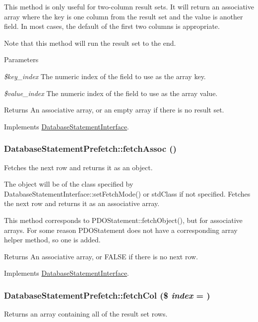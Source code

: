 This method is only useful for two-\/column result sets. It will return an associative array where the key is one column from the result set and the value is another field. In most cases, the default of the first two columns is appropriate.

Note that this method will run the result set to the end.


\begin{DoxyParams}{Parameters}
\item[{\em \$key\_\-index}]The numeric index of the field to use as the array key. \item[{\em \$value\_\-index}]The numeric index of the field to use as the array value.\end{DoxyParams}
\begin{DoxyReturn}{Returns}
An associative array, or an empty array if there is no result set. 
\end{DoxyReturn}


Implements \hyperlink{interfaceDatabaseStatementInterface_a9ffce739d0b144c36fc60b0a7e8a9824}{DatabaseStatementInterface}.\hypertarget{classDatabaseStatementPrefetch_ac3c2ce6d7d81888a503d8508e5562d2f}{
\subsubsection[{fetchAssoc}]{\setlength{\rightskip}{0pt plus 5cm}DatabaseStatementPrefetch::fetchAssoc ()}}
\label{classDatabaseStatementPrefetch_ac3c2ce6d7d81888a503d8508e5562d2f}
Fetches the next row and returns it as an object.

The object will be of the class specified by DatabaseStatementInterface::setFetchMode() or stdClass if not specified. Fetches the next row and returns it as an associative array.

This method corresponds to PDOStatement::fetchObject(), but for associative arrays. For some reason PDOStatement does not have a corresponding array helper method, so one is added.

\begin{DoxyReturn}{Returns}
An associative array, or FALSE if there is no next row. 
\end{DoxyReturn}


Implements \hyperlink{interfaceDatabaseStatementInterface_a754f04359c97c0866f5d80e785a24299}{DatabaseStatementInterface}.\hypertarget{classDatabaseStatementPrefetch_abf394498c6665e5f89c02e5e4a6292e1}{
\subsubsection[{fetchCol}]{\setlength{\rightskip}{0pt plus 5cm}DatabaseStatementPrefetch::fetchCol (\$ {\em index} = {})}}
\label{classDatabaseStatementPrefetch_abf394498c6665e5f89c02e5e4a6292e1}
Returns an array containing all of the result set rows.


